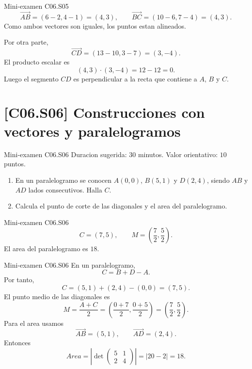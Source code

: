 \begin{fullsolution}{Mini-examen C06.S05}
\[
\overrightarrow{AB}=(6-2,4-1)=(4,3),
\qquad
\overrightarrow{BC}=(10-6,7-4)=(4,3).
\]
Como ambos vectores son iguales, los puntos estan alineados.

Por otra parte,
\[
\overrightarrow{CD}=(13-10,3-7)=(3,-4).
\]
El producto escalar es
\[
(4,3)\cdot(3,-4)=12-12=0.
\]
Luego el segmento \(CD\) es perpendicular a la recta que contiene a \(A\), \(B\) y \(C\).
\end{fullsolution}

\section{[C06.S06] Construcciones con vectores y paralelogramos}

\begin{exambrief}{Mini-examen C06.S06}
Duracion sugerida: \(30\) minutos. Valor orientativo: \(10\) puntos.
\begin{enumerate}
  \item En un paralelogramo se conocen \(A(0,0)\), \(B(5,1)\) y \(D(2,4)\), siendo \(AB\) y
  \(AD\) lados consecutivos. Halla \(C\).
  \item Calcula el punto de corte de las diagonales y el area del paralelogramo.
\end{enumerate}
\end{exambrief}

\begin{shortanswer}{Mini-examen C06.S06}
\[
C=(7,5),
\qquad
M=\left(\frac72,\frac52\right).
\]
El area del paralelogramo es \(18\).
\end{shortanswer}

\begin{fullsolution}{Mini-examen C06.S06}
En un paralelogramo,
\[
C=B+D-A.
\]
Por tanto,
\[
C=(5,1)+(2,4)-(0,0)=(7,5).
\]
El punto medio de las diagonales es
\[
M=\frac{A+C}{2}=
\left(\frac{0+7}{2},\frac{0+5}{2}\right)=
\left(\frac72,\frac52\right).
\]
Para el area usamos
\[
\overrightarrow{AB}=(5,1),
\qquad
\overrightarrow{AD}=(2,4).
\]
Entonces
\[
Area=
\left|
\det
\begin{pmatrix}
5&1\\
2&4
\end{pmatrix}
\right|
=|20-2|=18.
\]
\end{fullsolution}
